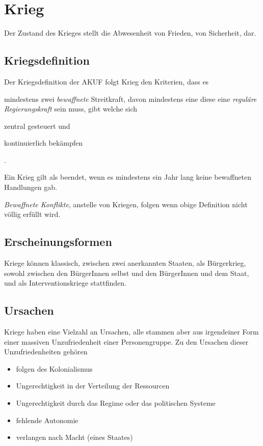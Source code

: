 \documentclass{article}
\begin{document}
\section{Krieg} 
Der Zustand des Krieges stellt die Abwesenheit von Frieden, von Sicherheit, dar.
 
\subsection{Kriegsdefinition} 
Der Kriegsdefinition der AKUF folgt Krieg den Kriterien, dass es \begin{enumerate*} \item mindestens zwei \emph{bewaffnete} Streitkraft, davon mindestens eine diese eine \emph{reguläre Regierungskraft} sein muss, gibt welche sich \item zentral gesteuert und \item kontinuierlich bekämpfen \end{enumerate*}. 
 
Ein Krieg gilt als beendet, wenn es mindestens ein Jahr lang keine bewaffneten Handlungen gab.
 
\emph{Bewaffnete Konflikte}, anstelle von Kriegen, folgen wenn obige Definition nicht völlig erfüllt wird.
 
\subsection{Erscheinungsformen}
Kriege können klassisch, zwischen zwei anerkannten Staaten, als Bürgerkrieg, sowohl zwischen den BürgerInnen selbst und den BürgerInnen und dem Staat, und als Interventionskriege stattfinden.
 
\subsection{Ursachen}
Kriege haben eine Vielzahl an Ursachen, alle stammen aber aus irgendeiner Form einer massiven Unzufriedenheit einer Personengruppe. Zu den Ursachen dieser Unzufriedenheiten gehören
\begin{itemize}[label=$\cdot$]
 \item folgen des Kolonialismus 
 \item Ungerechtigkeit in der Verteilung der Ressourcen
 \item Ungerechtigkeit durch das Regime oder das politischen Systeme
 \item fehlende Autonomie
 \item verlangen nach Macht (eines Staates)
\end{itemize}   
\end{document}
